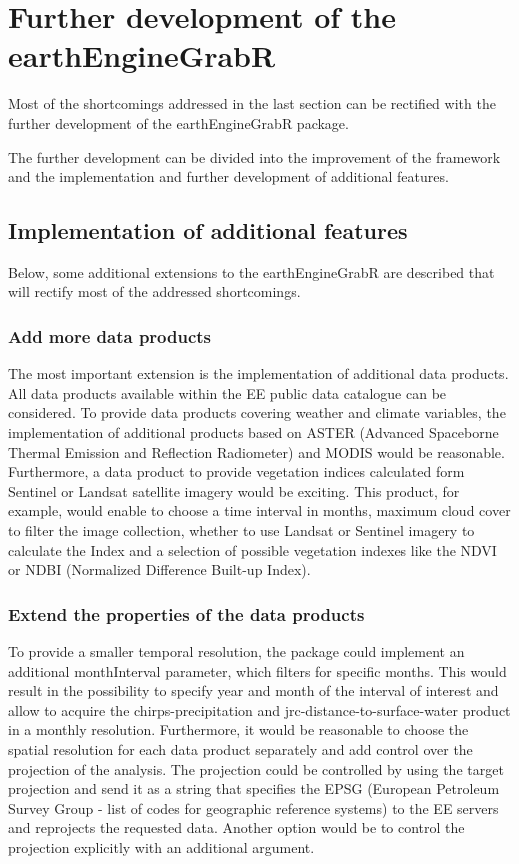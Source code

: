 \section{Further development of the earthEngineGrabR}

Most of the shortcomings addressed in the last section can be rectified with the further development of the earthEngineGrabR package. 

The further development can be divided into the improvement of the framework and the implementation and further development of additional features.

\subsection{Implementation of additional features}

Below, some additional extensions to the earthEngineGrabR are described that will rectify most of the addressed shortcomings.

\subsubsection{Add more data products}

The most important extension is the implementation of additional data products. All data products available within the EE public data catalogue can be considered. To provide data products covering weather and climate variables, the implementation of additional products based on ASTER (Advanced Spaceborne Thermal Emission and Reflection Radiometer) and MODIS would be reasonable. Furthermore, a data product to provide vegetation indices calculated form Sentinel or Landsat satellite imagery would be exciting. This product, for example, would enable to choose a time interval in months, maximum cloud cover to filter the image collection, whether to use Landsat or Sentinel imagery to calculate the Index and a selection of possible vegetation indexes like the NDVI or NDBI (Normalized Difference Built-up Index). 

\subsubsection{Extend the properties of the data products}
To provide a smaller temporal resolution, the package could implement an additional monthInterval parameter, which filters for specific months. This would result in the possibility to specify year and month of the interval of interest and allow to acquire the chirps-precipitation and jrc-distance-to-surface-water product in a monthly resolution.
Furthermore, it would be reasonable to choose the spatial resolution for each data product separately and add control over the projection of the analysis. 
The projection could be controlled by using the target projection and send it as a string that specifies the EPSG (European Petroleum Survey Group - list of codes for geographic reference systems) to the EE servers and reprojects the requested data. Another option would be to control the projection explicitly with an additional argument.


